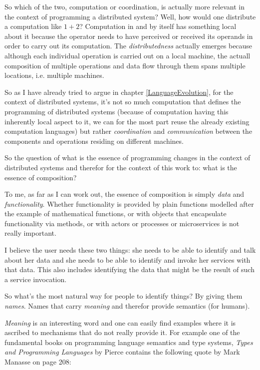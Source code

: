 So which of the two, computation or coordination, is actually
more relevant in the context of programming a distributed system?
Well, how would one distribute a computation like $1 + 2$?
Computation in and by itself has something local about it because
the operator needs to have perceived or received its operands in
order to carry out its computation. The \textit{distributedness}
actually emerges because although each individual operation is
carried out on a local machine, the actuall composition of multiple
operations and data flow through them spans multiple locations, i.e.
multiple machines.

So as I have already tried to argue in chapter \ref{LanguageEvolution},
for the context of distributed systems, it's not so much computation
that defines the programming of distributed systems (because
of computation having this inherently local aspect to it, we
can for the most part reuse the already existing computation languages)
but rather \textit{coordination} and \textit{communication} between
the components and operations residing on different machines.
\newline

So the question of what is the essence of programming
changes in the context of distributed systems and therefor for the
context of this work to: what is the essence of composition?
\newline

To me, as far as I can work out, the essence of composition
is simply \textit{data} and \textit{functionality}. Whether
functionality is provided by plain functions modelled after
the example of mathematical functions, or with objects that
encapsulate functionality via methods, or with actors or
processes or microservices is not really important.

I believe the user needs these two things: she needs to be
able to identify and talk about her data and she needs to be
able to identify and invoke her services with that data.
This also includes identifying the data that might be the
result of such a service invocation.

So what's the most natural way for people to identify things?
By giving them \textit{names}. Names that carry \textit{meaning}
and therefor provide semantics (for humans).
\newline

\textit{Meaning} is an interesting word and one can easily find examples
where it is ascribed to mechanisms that do not really provide it.
For example one of the fundamental books on programming language
semantics and type systems, \textit{Types and Programming Languages}
by Pierce \cite{pierce} contains the following quote by Mark Manasse
on page 208:

